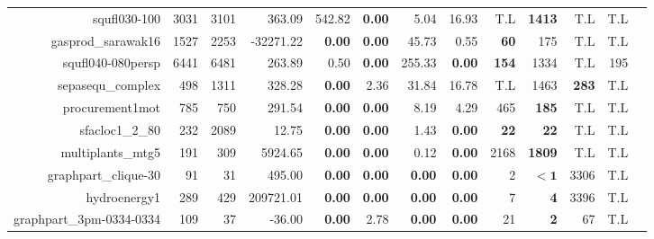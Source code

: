 \begin{landscape}
\begin{table*}[t]
\begin{tabular}{|r|r|r||r||r|r|r|r||r|r|r|r|r|}
                     squfl030-100 &         3031 &         3101 &              363.09 &         542.82 &  \textbf{0.00} &           5.04 &          16.93 &                T.L &      \textbf{1413} &          T.L &          T.L \\ 
               gasprod\_sarawak16 &         1527 &         2253 &           -32271.22 &  \textbf{0.00} &  \textbf{0.00} &          45.73 &           0.55 &        \textbf{60} &                175 &          T.L &          T.L \\ 
                squfl040-080persp &         6441 &         6481 &              263.89 &           0.50 &  \textbf{0.00} &         255.33 &  \textbf{0.00} &       \textbf{154} &               1334 &          T.L &          195 \\ 
                sepasequ\_complex &          498 &         1311 &              328.28 &  \textbf{0.00} &           2.36 &          31.84 &          16.78 &                T.L &               1463 & \textbf{283} &          T.L \\ 
                  procurement1mot &          785 &          750 &              291.54 &  \textbf{0.00} &  \textbf{0.00} &           8.19 &           4.29 &                465 &       \textbf{185} &          T.L &          T.L \\ 
                  sfacloc1\_2\_80 &          232 &         2089 &               12.75 &  \textbf{0.00} &  \textbf{0.00} &           1.43 &  \textbf{0.00} &        \textbf{22} &        \textbf{22} &          T.L &          T.L \\ 
                multiplants\_mtg5 &          191 &          309 &             5924.65 &  \textbf{0.00} &  \textbf{0.00} &           0.12 &  \textbf{0.00} &               2168 &      \textbf{1809} &          T.L &          T.L \\ 
             graphpart\_clique-30 &           91 &           31 &              495.00 &  \textbf{0.00} &  \textbf{0.00} &  \textbf{0.00} &  \textbf{0.00} &                  2 &         $\bm{< 1}$ &         3306 &          T.L \\ 
                     hydroenergy1 &          289 &          429 &           209721.01 &  \textbf{0.00} &  \textbf{0.00} &  \textbf{0.00} &  \textbf{0.00} &                  7 &         \textbf{4} &         3396 &          T.L \\ 
         graphpart\_3pm-0334-0334 &          109 &           37 &              -36.00 &  \textbf{0.00} &           2.78 &  \textbf{0.00} &  \textbf{0.00} &                 21 &         \textbf{2} &           67 &          T.L \\ 

\end{tabular}
\end{table*}
\end{landscape}
